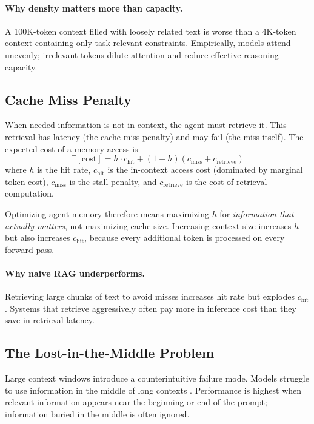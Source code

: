 \paragraph{Why density matters more than capacity.}
A 100K-token context filled with loosely related text is worse than a 4K-token context containing only task-relevant constraints. Empirically, models attend unevenly; irrelevant tokens dilute attention and reduce effective reasoning capacity.

\subsection{Cache Miss Penalty}

When needed information is not in context, the agent must retrieve it. This retrieval has latency (the cache miss penalty) and may fail (the miss itself). The expected cost of a memory access is
\[
\mathbb{E}[\text{cost}] = h \cdot c_{\text{hit}} + (1-h)(c_{\text{miss}} + c_{\text{retrieve}})
\]
where $h$ is the hit rate, $c_{\text{hit}}$ is the in-context access cost (dominated by marginal token cost), $c_{\text{miss}}$ is the stall penalty, and $c_{\text{retrieve}}$ is the cost of retrieval computation.

Optimizing agent memory therefore means maximizing $h$ for \emph{information that actually matters}, not maximizing cache size. Increasing context size increases $h$ but also increases $c_{\text{hit}}$, because every additional token is processed on every forward pass.

\paragraph{Why naive RAG underperforms.}
Retrieving large chunks of text to avoid misses increases hit rate but explodes $c_{\text{hit}}$. Systems that retrieve aggressively often pay more in inference cost than they save in retrieval latency.

\subsection{The Lost-in-the-Middle Problem}

Large context windows introduce a counterintuitive failure mode. Models struggle to use information in the middle of long contexts \cite{liu2024lost}. Performance is highest when relevant information appears near the beginning or end of the prompt; information buried in the middle is often ignored.

